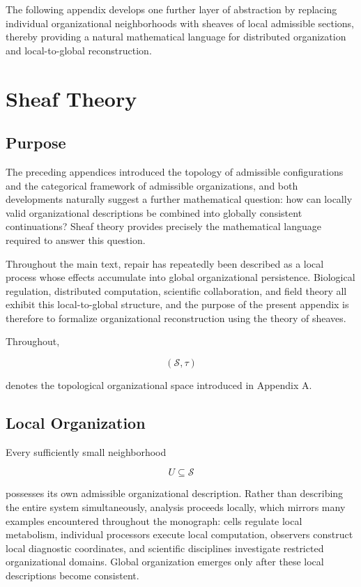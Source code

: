 \documentclass[11pt,oneside]{book}
\numberwithin{equation}{chapter}
\theoremstyle{definition}
\theoremstyle{plain}
\begin{document}
The following appendix develops one further layer of abstraction by replacing individual organizational neighborhoods with sheaves of local admissible sections, thereby providing a natural mathematical language for distributed organization and local-to-global reconstruction.

\chapter{Sheaf Theory}

\section{Purpose}

The preceding appendices introduced the topology of admissible configurations and the categorical framework of admissible organizations, and both developments naturally suggest a further mathematical question: how can locally valid organizational descriptions be combined into globally consistent continuations? Sheaf theory provides precisely the mathematical language required to answer this question.

Throughout the main text, repair has repeatedly been described as a local process whose effects accumulate into global organizational persistence. Biological regulation, distributed computation, scientific collaboration, and field theory all exhibit this local-to-global structure, and the purpose of the present appendix is therefore to formalize organizational reconstruction using the theory of sheaves.

Throughout,

\[
(\mathcal S,\tau)
\]

denotes the topological organizational space introduced in Appendix A.

\section{Local Organization}

Every sufficiently small neighborhood

\[
U
\subseteq
\mathcal S
\]

possesses its own admissible organizational description. Rather than describing the entire system simultaneously, analysis proceeds locally, which mirrors many examples encountered throughout the monograph: cells regulate local metabolism, individual processors execute local computation, observers construct local diagnostic coordinates, and scientific disciplines investigate restricted organizational domains. Global organization emerges only after these local descriptions become consistent.
\end{document}
